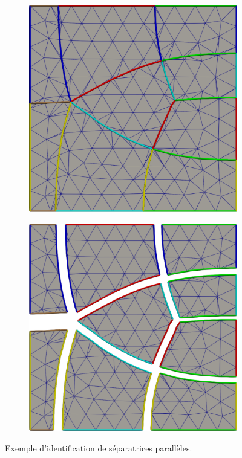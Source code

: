 \begin{figure}[h!]
\centering
\begin{subfigure}{0.49\textwidth}
    \includegraphics[width=\textwidth]{images/separatrice_echantillonage_1.pdf}
\end{subfigure}
\hfill
\begin{subfigure}{0.49\textwidth}
    \includegraphics[width=\textwidth]{images/separatrice_echantillonage_2.pdf}
\end{subfigure}
\caption{Exemple d'identification de séparatrices parallèles.}
\label{fig:separatrice_echantillonage}
\end{figure}

